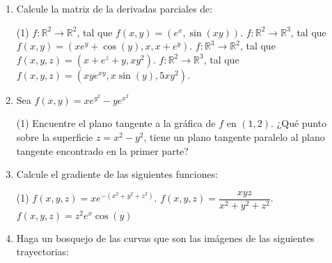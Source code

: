 \documentclass[letterpaper,11pt]{article}
\begin{document}
\begin{enumerate}


\item  Calcule la matriz de la derivadas parciales de: 

\begin{tasks}(1)
\task $f: \mathbb{R}^2  \longrightarrow \mathbb{R}^2$, tal que $f(x,y) = (e^x,\sin(xy))$.
\task $f: \mathbb{R}^2  \longrightarrow \mathbb{R}^3$, tal que $f(x,y) = (xe^y + \cos(y), x, x + e^y)$.
\task $f: \mathbb{R}^3  \longrightarrow \mathbb{R}^2$, tal que $f(x,y,z) = (x + e^z + y, xy^2)$.
\task $f: \mathbb{R}^2  \longrightarrow \mathbb{R}^3$, tal que $f(x,y,z) = (xye^{xy}, x\sin(y), 5xy^2)$.
\end{tasks}


\item  Sea $f(x,y) = xe^{y^2} - ye^{x^2}$

\begin{tasks}(1)
\task Encuentre el plano tangente a la gráfica de $f$ en $(1, 2)$.
\task ¿Qué punto sobre la superficie $z = x^2 -y^2$, tiene un plano tangente paralelo al plano tangente encontrado en la primer parte?
\end{tasks}

\item  Calcule el gradiente de las siguientes funciones: 

\begin{tasks}(1)
\task $f(x,y,z) = x e^{-(x^2 +y^2 +z^2)}$.
\task $f(x,y,z) = \dfrac{xyz}{x^2 +y^2 +z^2}$.
\task $f(x,y,z) = z^2e^x\cos(y)$
\end{tasks}

\item Haga un bosquejo de las curvas que son las imágenes de las siguientes trayectorias:


\end{enumerate}
\end{document}

